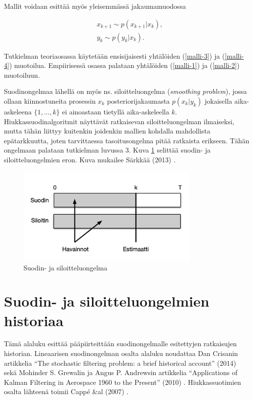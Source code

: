 \documentclass[
  12pt,
  a4paper, twoside]{book}
\begin{document}
Mallit voidaan esittää myös yleisemmässä jakaumamuodossa

\begin{align}
&\label{malli-3} x_{k+1} \sim p(x_{k+1}|x_k),\\
&\label{malli-4} y_{k} \sim p(y_k|x_k).
\end{align}

Tutkielman teoriaosassa käytetään ensisijaisesti yhtälöiden (\ref{malli-3}) ja (\ref{malli-4}) muotoilua. Empiirisessä osassa palataan yhtälöiden (\ref{malli-1}) ja (\ref{malli-2}) muotoiluun.

Suodinongelmaa lähellä on myös ns. siloitteluongelma (\emph{smoothing problem}), jossa ollaan kiinnostuneita prosessin \(x_k\) posteriorijakaumasta \(p(x_k|y_k)\) jokaisella aika-askeleena \(\{1,\ldots,k\}\) ei ainoastaan tietyllä aika-askeleella \(k\). Hiukkassuodinalgoritmit näyttävät ratkaisevan siloitteluongelman ilmaiseksi, mutta tähän liittyy kuitenkin joidenkin mallien kohdalla mahdollista epätarkkuutta, joten tarvittaessa tasoitusongelma pitää ratkaista erikseen. Tähän ongelmaan palataan tutkielman luvussa 3. Kuva \ref{fig:suodin_vs_siloitin} selittää suodin- ja siloitteluongelmien eron. Kuva mukailee Särkkää (2013) \citep{sarkka-2013}.

\begin{figure}[H]
\centering
\includegraphics[width=9cm]{suodin_vs_siloitin_cropped}
\caption{Suodin- ja siloitteluongelma}
\label{fig:suodin_vs_siloitin}
\end{figure}

\section{Suodin- ja siloitteluongelmien historiaa}

Tämä alaluku esittää pääpiirteittään suodinongelmalle esitettyjen ratkaisujen historian. Lineaarisen suodinongelman osalta alaluku noudattaa Dan Crisanin artikkelia ``The stochastic filtering problem: a brief historical account'' (2014) \citep{crisan-2014} sekä Mohinder S. Grewalin ja Angus P. Andrewsin artikkelia ``Applications of Kalman Filtering in Aerospace 1960 to the Present'' (2010) \citep{Grewal-2010}. Hiukkassuotimien osalta lähteenä toimii Cappé \&al (2007) \citep{cappe-2007}.
\end{document}
